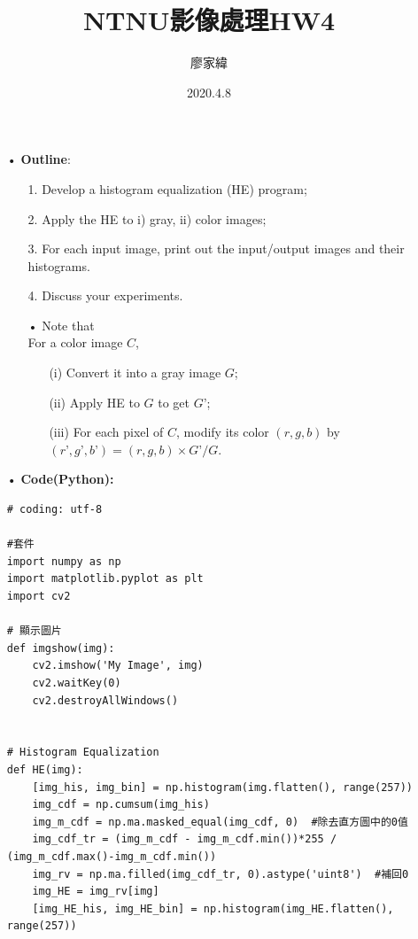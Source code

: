 \documentclass[12pt,a4paper]{article}
\title{NTNU影像處理HW4}
\author{廖家緯}
\date{2020.4.8}
\begin{document}
\maketitle
\fontsize{12pt}{20pt}\selectfont
\setlength{\baselineskip}{20pt}

\pagestyle{fancy}
\lhead{}
\chead{}
\rhead{}
\lfoot{}
\cfoot{\thepage}
\rfoot{}
\renewcommand{\headrulewidth}{0pt} %
\renewcommand{\footrulewidth}{0pt} %




\begin{enumerate}
\item[•]{\bf Outline}:
\begin{enumerate}
\item[1.]
Develop a histogram equalization (HE) program;
\item[2.]
Apply the HE to i) gray, ii) color images;
\item[3.]
For each input image, print out the input/output images and their histograms.
\item[4.]
Discuss your experiments.
\item[•]Note that\\
For a color image $C$, 
\begin{enumerate}
\item[(i)]Convert it into a gray image $G$;
\item[(ii)]Apply HE to $G$ to get $G’$;
\item[(iii)]
For each pixel of $C$, modify its color $(r,g,b)$ by
$(r’,g’,b’) = (r,g,b) \times G’ / G$.\\
\end{enumerate}

\end{enumerate}


\item[•]
{\bf Code(Python):}
\begin{lstlisting}
# coding: utf-8

#套件
import numpy as np
import matplotlib.pyplot as plt
import cv2

# 顯示圖片
def imgshow(img):
    cv2.imshow('My Image', img)
    cv2.waitKey(0)
    cv2.destroyAllWindows()


# Histogram Equalization
def HE(img):
    [img_his, img_bin] = np.histogram(img.flatten(), range(257))
    img_cdf = np.cumsum(img_his) 
    img_m_cdf = np.ma.masked_equal(img_cdf, 0)  #除去直方圖中的0值
    img_cdf_tr = (img_m_cdf - img_m_cdf.min())*255 / (img_m_cdf.max()-img_m_cdf.min())
    img_rv = np.ma.filled(img_cdf_tr, 0).astype('uint8')  #補回0
    img_HE = img_rv[img]
    [img_HE_his, img_HE_bin] = np.histogram(img_HE.flatten(), range(257))


\end{lstlisting}
\end{enumerate}
\end{document}

